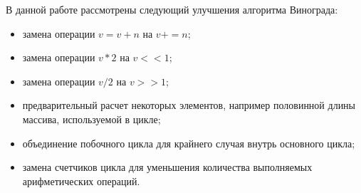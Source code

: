 В данной работе рассмотрены следующий улучшения алгоритма Винограда:

\begin{itemize}
	\item замена операции $v = v + n$ на $v += n$;
	\item замена операции $v * 2$ на $v << 1$;
	\item замена операции $v / 2$ на $v >> 1$;
	\item предварительный расчет некоторых элементов, например половинной длины массива, используемой в цикле;
	\item объединение побочного цикла для крайнего случая внутрь основного цикла;
	\item замена счетчиков цикла для уменьшения количества выполняемых арифметических операций.
\end{itemize}

\newpage